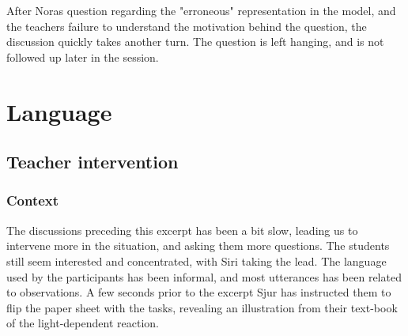 After Noras question regarding the "erroneous" representation in the model, and the teachers failure to understand the motivation behind the question, the discussion quickly takes another turn. The question is left hanging, and is not followed up later in the session.  


\section{Language}

\subsection{Teacher intervention}

\subsubsection*{Context}
The discussions preceding this excerpt has been a bit slow, leading us to intervene more in the situation, and asking them more questions. The students still seem interested and concentrated, with Siri taking the lead. The language used by the participants has been informal, and most utterances has been related to observations. A few seconds prior to the excerpt Sjur has instructed them to flip the paper sheet with the tasks, revealing an illustration from their text-book of the light-dependent reaction. 
